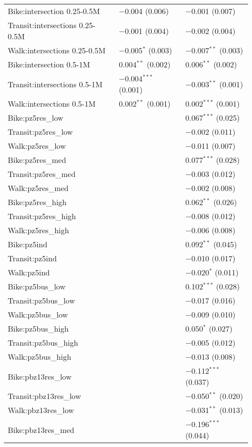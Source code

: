 \begin{longtabu}{lll}
	Bike:intersection 0.25-0.5M & $-$0.004 (0.006) & $-$0.001 (0.007) \\ 
	Transit:intersections 0.25-0.5M & $-$0.001 (0.004) & $-$0.002 (0.004) \\ 
	Walk:intersections 0.25-0.5M & $-$0.005$^{*}$ (0.003) & $-$0.007$^{**}$ (0.003) \\ 
	Bike:intersection 0.5-1M & 0.004$^{**}$ (0.002) & 0.006$^{**}$ (0.002) \\ 
	Transit:intersections 0.5-1M & $-$0.004$^{***}$ (0.001) & $-$0.003$^{**}$ (0.001) \\ 
	Walk:intersections 0.5-1M & 0.002$^{**}$ (0.001) & 0.002$^{***}$ (0.001) \\ 
	Bike:pz5res\_low &  & 0.067$^{***}$ (0.025) \\ 
	Transit:pz5res\_low &  & $-$0.002 (0.011) \\ 
	Walk:pz5res\_low &  & $-$0.011 (0.007) \\ 
	Bike:pz5res\_med &  & 0.077$^{***}$ (0.028) \\ 
	Transit:pz5res\_med &  & $-$0.003 (0.012) \\ 
	Walk:pz5res\_med &  & $-$0.002 (0.008) \\ 
	Bike:pz5res\_high &  & 0.062$^{**}$ (0.026) \\ 
	Transit:pz5res\_high &  & $-$0.008 (0.012) \\ 
	Walk:pz5res\_high &  & $-$0.006 (0.008) \\ 
	Bike:pz5ind &  & 0.092$^{**}$ (0.045) \\ 
	Transit:pz5ind &  & $-$0.010 (0.017) \\ 
	Walk:pz5ind &  & $-$0.020$^{*}$ (0.011) \\ 
	Bike:pz5bus\_low &  & 0.102$^{***}$ (0.028) \\ 
	Transit:pz5bus\_low &  & $-$0.017 (0.016) \\ 
	Walk:pz5bus\_low &  & $-$0.009 (0.010) \\ 
	Bike:pz5bus\_high &  & 0.050$^{*}$ (0.027) \\ 
	Transit:pz5bus\_high &  & $-$0.005 (0.012) \\ 
	Walk:pz5bus\_high &  & $-$0.013 (0.008) \\ 
	Bike:pbz13res\_low &  & $-$0.112$^{***}$ (0.037) \\ 
	Transit:pbz13res\_low &  & $-$0.050$^{**}$ (0.020) \\ 
	Walk:pbz13res\_low &  & $-$0.031$^{**}$ (0.013) \\ 
	Bike:pbz13res\_med &  & $-$0.196$^{***}$ (0.044) \\ 

\end{longtabu}
